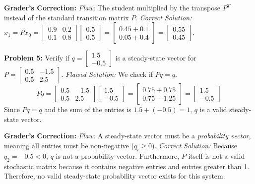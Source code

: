 \documentclass[11pt, letterpaper]{article}
\theoremstyle{definition}
\theoremstyle{remark}
\begin{document}
\textbf{Grader's Correction:}
\textit{Flaw:} The student multiplied by the transpose $P^T$ instead of the standard transition matrix $P$.
\textit{Correct Solution:} $x_1 = P x_0 = \begin{bmatrix} 0.9 & 0.2 \\ 0.1 & 0.8 \end{bmatrix} \begin{bmatrix} 0.5 \\ 0.5 \end{bmatrix} = \begin{bmatrix} 0.45 + 0.1 \\ 0.05 + 0.4 \end{bmatrix} = \begin{bmatrix} 0.55 \\ 0.45 \end{bmatrix}$.

\vspace{1em}
\textbf{Problem 5:} Verify if $q = \begin{bmatrix} 1.5 \\ -0.5 \end{bmatrix}$ is a steady-state vector for $P = \begin{bmatrix} 0.5 & -1.5 \\ 0.5 & 2.5 \end{bmatrix}$.
\textit{Flawed Solution:} We check if $Pq = q$. 
\[ Pq = \begin{bmatrix} 0.5 & -1.5 \\ 0.5 & 2.5 \end{bmatrix} \begin{bmatrix} 1.5 \\ -0.5 \end{bmatrix} = \begin{bmatrix} 0.75 + 0.75 \\ 0.75 - 1.25 \end{bmatrix} = \begin{bmatrix} 1.5 \\ -0.5 \end{bmatrix} \]
Since $Pq = q$ and the sum of the entries is $1.5 + (-0.5) = 1$, $q$ is a valid steady-state vector.

\textbf{Grader's Correction:}
\textit{Flaw:} A steady-state vector must be a \textit{probability vector}, meaning all entries must be non-negative ($q_i \geq 0$).
\textit{Correct Solution:} Because $q_2 = -0.5 < 0$, $q$ is not a probability vector. Furthermore, $P$ itself is not a valid stochastic matrix because it contains negative entries and entries greater than 1. Therefore, no valid steady-state probability vector exists for this system.
\end{document}

